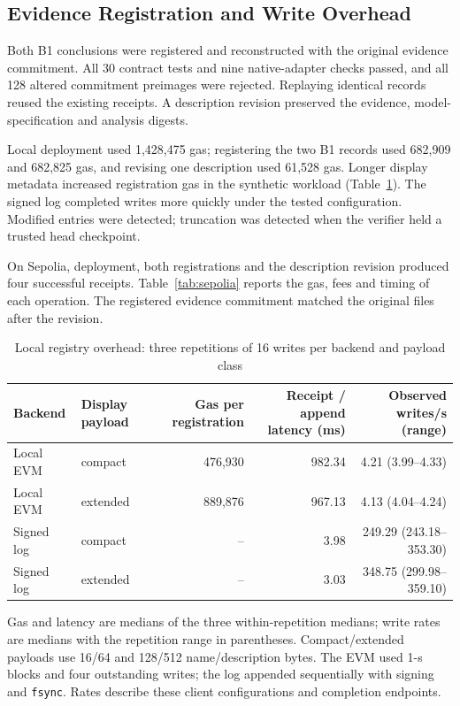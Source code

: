 \subsection{Evidence Registration and Write Overhead}
\label{sec:chain-results}
Both B1 conclusions were registered and reconstructed with the original evidence commitment. All 30 contract tests and nine native-adapter checks passed, and all 128 altered commitment preimages were rejected. Replaying identical records reused the existing receipts. A description revision preserved the evidence, model-specification and analysis digests.

Local deployment used 1,428,475 gas; registering the two B1 records used 682,909 and 682,825 gas, and revising one description used 61,528 gas. Longer display metadata increased registration gas in the synthetic workload (Table~\ref{tab:registry}). The signed log completed writes more quickly under the tested configuration. Modified entries were detected; truncation was detected when the verifier held a trusted head checkpoint.

On Sepolia, deployment, both registrations and the description revision produced four successful receipts. Table~\ref{tab:sepolia} reports the gas, fees and timing of each operation. The registered evidence commitment matched the original files after the revision.

\begin{table}[t]
\centering
\caption{Local registry overhead: three repetitions of 16 writes per backend and payload class}
\label{tab:registry}
\setlength{\tabcolsep}{7pt}
\begin{tabular}{@{}llrrr@{}}
\toprule
Backend & Display payload & Gas per registration & Receipt / append latency (ms) & Observed writes/s (range) \\
\midrule
Local EVM & compact & 476,930 & 982.34 & 4.21 (3.99--4.33) \\
Local EVM & extended & 889,876 & 967.13 & 4.13 (4.04--4.24) \\
Signed log & compact & -- & 3.98 & 249.29 (243.18--353.30) \\
Signed log & extended & -- & 3.03 & 348.75 (299.98--359.10) \\
\bottomrule
\end{tabular}
\par\smallskip
\begin{minipage}{0.96\textwidth}\footnotesize
Gas and latency are medians of the three within-repetition medians; write rates are medians with the repetition range in parentheses. Compact/extended payloads use 16/64 and 128/512 name/description bytes. The EVM used 1-s blocks and four outstanding writes; the log appended sequentially with signing and \texttt{fsync}. Rates describe these client configurations and completion endpoints.
\end{minipage}
\end{table}

